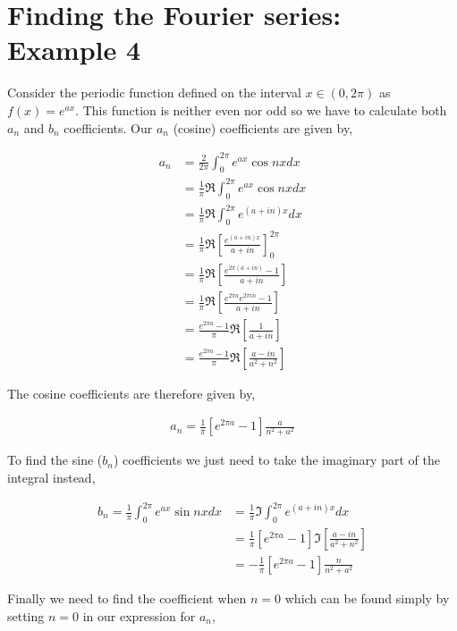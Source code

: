 \documentclass[11pt]{amsart}
\begin{document}
\section{Finding the Fourier series: Example 4}

Consider the periodic function defined on the interval $x\in(0, 2\pi)$ as $f(x) = e^{ax}$. This function is neither even nor odd so we have to calculate both $a_n$ and $b_n$ coefficients. Our $a_n$ (cosine) coefficients are given by,

\begin{align*}
  a_n &= \frac{2}{2\pi}\int_0^{2\pi}e^{ax}\cos{nx}dx \\
      &= \frac{1}{\pi} \Re \int_0^{2\pi}e^{ax}\cos{nx}dx \\
      &= \frac{1}{\pi} \Re \int_0^{2\pi}e^{(a+in)x} dx \\
      &= \frac{1}{\pi} \Re {\left[\frac{e^{(a+in)x}}{a+in}\right]}_0^{2\pi} \\
      &= \frac{1}{\pi} \Re \left[\frac{e^{2\pi(a+in)} - 1}{a+in}\right] \\
      &= \frac{1}{\pi} \Re \left[\frac{e^{2\pi a}e^{2\pi in} - 1}{a+in}\right] \\
      &= \frac{e^{2\pi a} - 1}{\pi} \Re \left[\frac{1}{a+in}\right] \\
      &= \frac{e^{2\pi a} - 1}{\pi} \Re \left[\frac{a-in}{a^2+n^2}\right]
\end{align*}

The cosine coefficients are therefore given by,

\begin{align*}
  a_n = \frac{1}{\pi}\left[e^{2\pi a} - 1\right]\frac{a}{n^2+a^2}
\end{align*}

To find the sine ($b_n$) coefficients we just need to take the imaginary part of the integral instead,

\begin{align*}
  b_n = \frac{1}{\pi}\int_0^{2\pi}e^{ax}\sin{nx}dx &= \frac{1}{\pi}\Im\int_0^{2\pi}e^{(a+in)x}dx \\
                                                   &= \frac{1}{\pi}\left[e^{2\pi a}-1\right] \Im\left[\frac{a-in}{a^2+n^2}\right] \\
                                                   &= -\frac{1}{\pi}\left[e^{2\pi a}-1\right]\frac{n}{n^2+a^2}
\end{align*}

Finally we need to find the coefficient when $n = 0$ which can be found simply by setting $n = 0$ in our expression for $a_n$,
\end{document}
